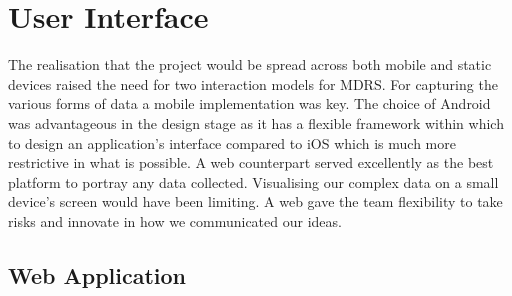 \documentclass{l3proj}
\begin{document}
\section{User Interface} 		The realisation that the project would be spread across both mobile and static devices raised the need for two interaction models for MDRS. For capturing the various forms of data a mobile implementation was key. The choice of Android was advantageous in the design stage as it has a flexible framework within which to design an application's interface compared to iOS which is much more restrictive in what is possible. A web counterpart served excellently as the best platform to portray any data collected. Visualising our complex data on a small device's screen would have been limiting. A web gave the team flexibility to take risks and innovate in how we communicated our ideas.

\subsection{Web Application}


\end{document}

